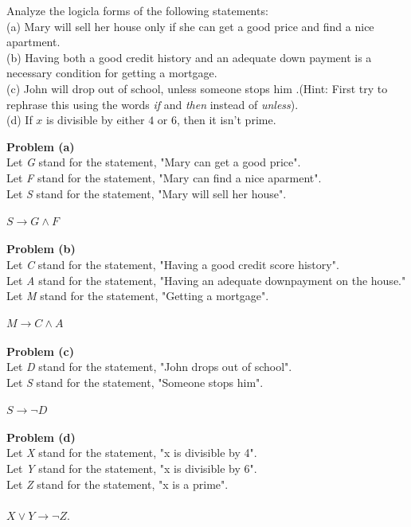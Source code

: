 \begin{tcolorbox}[title=Problem 2, breakable]
Analyze the logicla forms of the following statements: \\
(a) Mary will sell her house only if she can get a good price and find a nice apartment. \\
(b) Having both a good credit history and an adequate down payment is a necessary
condition for getting a mortgage. \\
(c) John will drop out of school, unless someone stops him .(Hint: First try to
rephrase this using the words \textit{if} and \textit{then} instead of \textit{unless}). \\
(d) If $x$ is divisible by either $4$ or $6$, then it isn't prime.
\end{tcolorbox}

\textbf{Problem (a)} \\
Let \textit{G} stand for the statement, "Mary can get a good price". \\
Let \textit{F} stand for the statement, "Mary can find a nice aparment". \\
Let \textit{S} stand for the statement, "Mary will sell her house". \\ \\
$S \rightarrow G \wedge F$ \\ \\
\textbf{Problem (b)} \\
Let \textit{C} stand for the statement, "Having a good credit score history". \\
Let \textit{A} stand for the statement, "Having an adequate downpayment on the house." \\
Let \textit{M} stand for the statement, "Getting a mortgage". \\ \\
$M \rightarrow C \wedge A$ \\ \\
\textbf{Problem (c)} \\
Let \textit{D} stand for the statement, "John drops out of school". \\
Let \textit{S} stand for the statement, "Someone stops him". \\ \\
$S \rightarrow \neg D$ \\ \\
\textbf{Problem (d)} \\
Let \textit{X} stand for the statement, "x is divisible by 4". \\
Let \textit{Y} stand for the statement, "x is divisible by 6". \\
Let \textit{Z} stand for the statement, "x is a prime". \\ \\
$X \vee Y \rightarrow \neg Z$.

